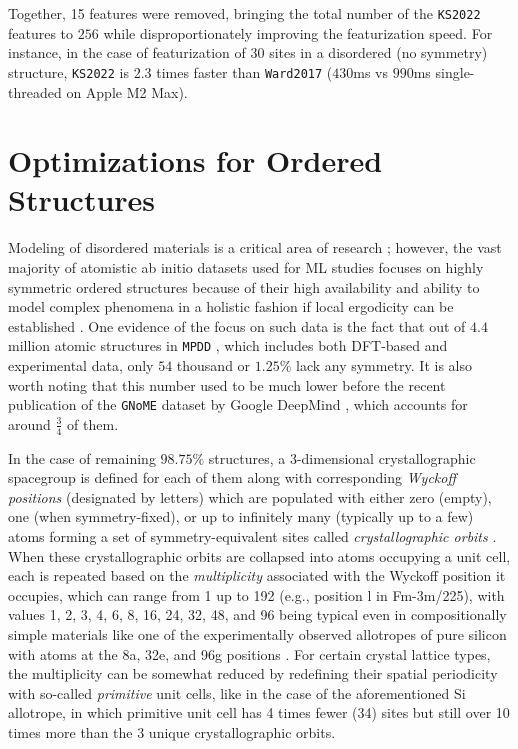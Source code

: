 Together, 15 features were removed, bringing the total number of the \texttt{KS2022} features to $256$ while disproportionately improving the featurization speed. For instance, in the case of featurization of 30 sites in a disordered (no symmetry) structure, \texttt{KS2022} is $2.3$ times faster than \texttt{Ward2017} ($430$ms vs $990$ms single-threaded on Apple M2 Max).

\section{Optimizations for Ordered Structures} \label{pysipfenn:sec:ordered}

Modeling of disordered materials is a critical area of research \cite{Zaki2023Glassomics:Intelligence}; however, the vast majority of atomistic ab initio datasets used for ML studies focuses on highly symmetric ordered structures because of their high availability and ability to model complex phenomena in a holistic fashion if local ergodicity can be established \cite{Liu2022TheoryTheorem, Liu2023ThermodynamicsPerspectives}. One evidence of the focus on such data is the fact that out of $4.4$ million atomic structures in \texttt{MPDD} \cite{Krajewski2021MPDD:Database}, which includes both DFT-based \cite{Saal2013MaterialsOQMD, Kirklin2015TheEnergies, Shen2022ReflectionsOQMD, Curtarolo2013AFLOW:Discovery, Toher2018TheDiscovery, Jain2013Commentary:Innovation, Choudhary2020TheDesign, Merchant2023ScalingDiscovery} and experimental \cite{Grazulis2009CrystallographyStructures, Grazulis2012CrystallographyCollaboration, Grazulis2019CrystallographyPerspectives} data, only $54$ thousand or $1.25\%$ lack any symmetry. It is also worth noting that this number used to be much lower before the recent publication of the \texttt{GNoME} dataset by Google DeepMind \cite{Merchant2023ScalingDiscovery}, which accounts for around $\frac{3}{4}$ of them. 

In the case of remaining $98.75\%$ structures, a 3-dimensional crystallographic spacegroup is defined for each of them along with corresponding \emph{Wyckoff positions} (designated by letters) which are populated with either zero (empty), one (when symmetry-fixed), or up to infinitely many (typically up to a few) atoms forming a set of symmetry-equivalent sites called \emph{crystallographic orbits} \cite{Muller2006RemarksPositions}. When these crystallographic orbits are collapsed into atoms occupying a unit cell, each is repeated 
based on the \emph{multiplicity} associated with the Wyckoff position it occupies, which can range from 1 up to 192 (e.g., position l in Fm-3m/225), with values 1, 2, 3, 4, 6, 8, 16, 24, 32, 48, and 96 being typical \cite{Mehl2016ThePrototypes} even in compositionally simple materials like one of the experimentally observed allotropes of pure silicon with atoms at the 8a, 32e, and 96g positions \cite{Gryko2000Low-densityGap}. For certain crystal lattice types, the multiplicity can be somewhat reduced by redefining their spatial periodicity with so-called \textit{primitive} unit cells, like in the case of the aforementioned Si allotrope, in which primitive unit cell has 4 times fewer (34) sites but still over 10 times more than the 3 unique crystallographic orbits.

